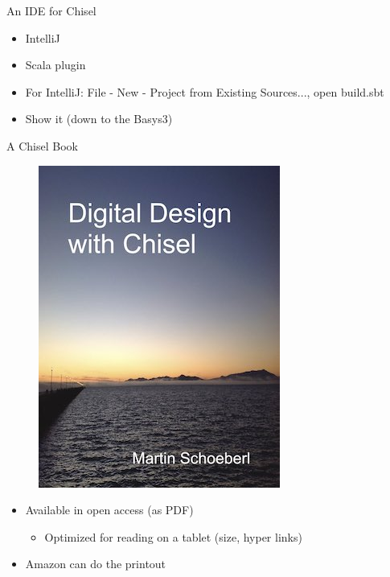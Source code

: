 \begin{frame}[fragile]{An IDE for Chisel}
\begin{itemize}
\item IntelliJ
\item Scala plugin
\item For IntelliJ: File - New - Project from Existing Sources..., open build.sbt
\item Show it (down to the Basys3)
\end{itemize}
\end{frame}


\begin{frame}[fragile]{A Chisel Book}
\begin{figure}
    \centering
    \href{https://github.com/schoeberl/chisel-book}{\includegraphics[scale=0.4]{../cover-small}}
\end{figure}

\begin{itemize}
\item Available in open access (as PDF)
\begin{itemize}
\item Optimized for reading on a tablet (size, hyper links)
\end{itemize}
\item Amazon can do the printout
\end{itemize}
\end{frame}

